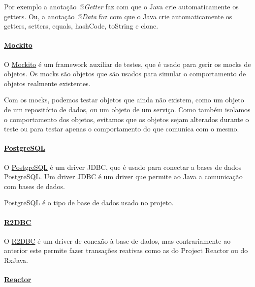 Por exemplo a anotação \textit{@Getter} faz com que o Java crie automaticamente os getters. Ou, a anotação \textit{@Data} faz com que o Java crie automaticamente os getters, setters, equals, hashCode, toString e clone.

\paragraph{\href{https://site.mockito.org/}{Mockito}\\}

O \href{https://site.mockito.org/}{Mockito} é um framework auxiliar de testes, que é usado para gerir os mocks de objetos. Os mocks são objetos que são usados para simular o comportamento de objetos realmente existentes.

Com os mocks, podemos testar objetos que ainda não existem, como um objeto de um repositório de dados, ou um objeto de um serviço. Como também isolamos o comportamento dos objetos, evitamos que os objetos sejam alterados durante o teste ou para testar apenas o comportamento do que comunica com o mesmo.

\paragraph{\href{https://jdbc.postgresql.org/}{PostgreSQL}\\}

O \href{https://jdbc.postgresql.org/}{PostgreSQL} é um driver JDBC, que é usado para conectar a bases de dados PostgreSQL. Um driver JDBC é um driver que permite ao Java a comunicação com bases de dados.

PostgreSQL é o tipo de base de dados usado no projeto.

\paragraph{\href{https://r2dbc.io/}{R2DBC}\\}

O \href{https://r2dbc.io/}{R2DBC} é um driver de conexão à base de dados, mas contrariamente ao anterior este permite fazer transações reativas como as do Project Reactor ou do RxJava.

\paragraph{\href{https://projectreactor.io/}{Reactor}\\}

